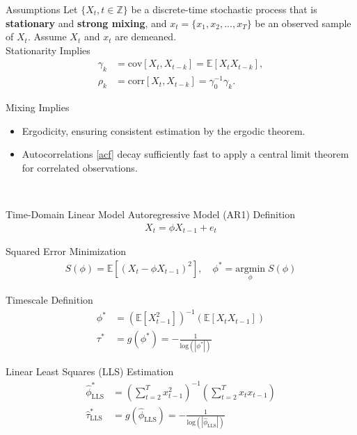 \documentclass[8pt,aspectratio=169]{beamer}
\begin{document}
\begin{frame}{Assumptions}
Let $\{X_t, t\in \mathbb{Z}\}$ be a discrete-time stochastic process that is \textbf{stationary} and \textbf{strong mixing}, and $x_t = \{x_1, x_2, ..., x_T\}$ be an observed sample of $X_t$. Assume $X_t$ and $x_t$ are demeaned.\\
\vfill
Stationarity Implies
\begin{align}
    \gamma_k &= \text{cov}[X_t, X_{t-k}] = \mathbb{E}[X_t X_{t-k}],\\
    \rho_k &= \text{corr}[X_t, X_{t-k}] = \gamma_0^{-1}\gamma_k\label{acf}.
\end{align}

Mixing Implies
\begin{itemize}
    \item Ergodicity, ensuring consistent estimation by the ergodic theorem.
    \item Autocorrelations \eqref{acf} decay sufficiently fast to apply a central limit theorem for correlated observations.
\end{itemize}
\vfill
\citet{hansen_econometrics_2022, white_nonlinear_1984, newey_simple_1987}\\
\end{frame}

\begin{frame}{Time-Domain Linear Model}
\vfill
Autoregressive Model (AR1) Definition
\begin{align}
    X_t = \phi X_{t-1} + e_t
\end{align}

Squared Error Minimization
\begin{align}
    S(\phi) = \mathbb{E}[(X_t - \phi X_{t-1})^2],\quad \phi^* = \underset{\phi}{\text{argmin}} \; S(\phi)
\end{align}

Timescale Definition
\begin{align}
    \phi^* &= (\mathbb{E}[X_{t-1}^2])^{-1}(\mathbb{E}[X_t X_{t-1}])\\
    \tau^* &= g(\phi^*) = -\frac{1}{\text{log}(|\phi^*|)}
\end{align}

Linear Least Squares (LLS) Estimation
\begin{align}
    \hat\phi^*_{\scriptscriptstyle\text{LLS}} &= \left(\sum_{t=2}^T x_{t-1}^2\right)^{-1} \left(\sum_{t=2}^T x_t x_{t-1}\right)\\
    \hat\tau^*_{\scriptscriptstyle\text{LLS}} &= g(\hat\phi_{\scriptscriptstyle\text{LLS}}) = -\frac{1}{\text{log}(|\hat\phi_{\scriptscriptstyle\text{LLS}}|)}
\end{align}

\end{frame}
\end{document}

